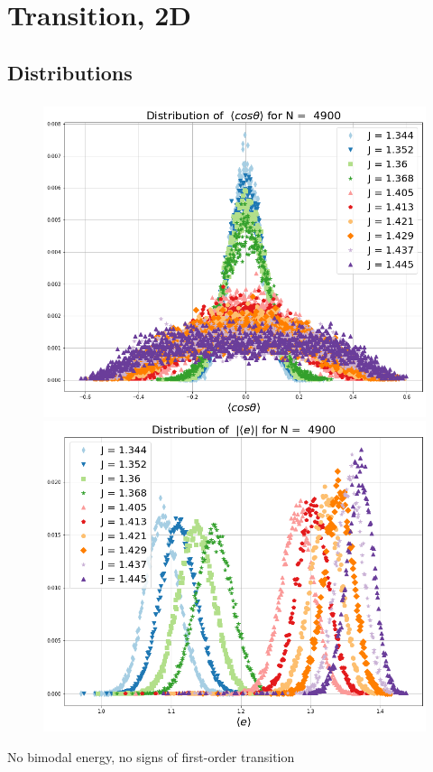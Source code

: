 \documentclass{beamer}
\begin{document}
\section{Transition, 2D}
\subsection{Distributions }
\begin{frame}
		\frametitle{\insertsection}
	\framesubtitle{\insertsubsection}
   \begin{figure}
 	\centering
 	\includegraphics[scale=0.1825]{Images/distr_cos_4900.png}
 	\includegraphics[scale=0.1825]{Images/distr_energy_4900.png}
 	\label{fig:distributions}
 \end{figure}
 \centering	No bimodal energy, no signs of first-order transition 
\end{frame}
\end{document}
